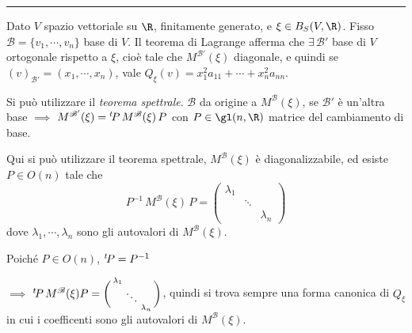 
\rule{7em}{.4pt}

Dato $ V $ spazio vettoriale su $ \R$, finitamente generato, e $ \xi \in B_{S}(V, \R)  $. Fisso $ \mathscr{B}=\{v_1, \cdots,v_{n}\} $ base di $ V $. Il teorema di Lagrange afferma che $ \exists\, \mathscr{B}' $ base di $ V $ ortogonale rispetto a $ \xi $, cioè tale che $ M^{ \mathscr{B}'}(\xi) $ diagonale, e quindi se $ (v)_{ \mathscr{B}'}=(x_1, \cdots, x_{n} ) $, vale $ Q_{\xi}(v)=x_1^{2}a_{11}+\cdots+ x_{n}^{2}a_{nn}    $.

Si può utilizzare il \textit{teorema spettrale}. $ \mathscr{B} $ da origine a $ M^{ \mathscr{B}}(\xi) $, se $ \mathscr{B}' $ è un'altra base $\implies$ $ M^{ \mathscr{B}'}(\xi)=\null^{t}\!P\,M^{ \mathscr{B}}(\xi)\, P $ con $ P \in \gl(n, \R) $ matrice del cambiamento di base. 

Qui si può utilizzare il teorema spettrale, $ M^{ \mathscr{B}}(\xi) $ è diagonalizzabile, ed esiste $ P \in O(n) $ tale che \[P^{-1}\, M^{ \mathscr{B}}(\xi)\,P=\begin{pmatrix}
    \lambda_1 & & \\
    & \ddots &\\
    & & \lambda_{n} 
\end{pmatrix}\] dove $ \lambda_1, \cdots, \lambda_{n}  $ sono gli autovalori di $ M^{ \mathscr{B}}(\xi) $. 

Poiché $ P \in O(n) $, $ \null^{t}\!P=P^{-1} $ 

$\implies$ $ \null^{t}\!P\,M^{ \mathscr{B}}(\xi) P = \biggl(\begin{smallmatrix}
    \lambda_1 & & \\
    & \ddots &\\
    & & \lambda_{n} 
\end{smallmatrix}\biggr) $, quindi si trova sempre una forma canonica di $ Q_{\xi}  $ in cui i coefficenti sono gli autovalori di $ M^{ \mathscr{B}}(\xi) $.

